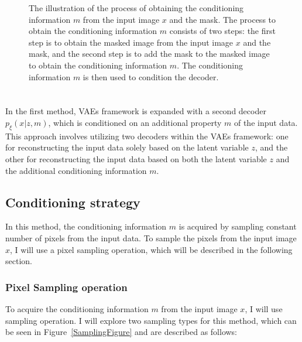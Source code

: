 \begin{figure}
    \centering
    
    \caption[The illustration of the process of obtaining the conditioning information $m$ from the input image $x$ and the mask.]%
    {
        The illustration of the process of obtaining the conditioning information $m$ from the input image $x$ and the mask. The process to obtain the conditioning information $m$ consists of two steps: the first step is to obtain the masked image from the input image $x$ and the mask, and the second step is to add the mask to the masked image to obtain the conditioning information $m$. The conditioning information $m$ is then used to condition the decoder.
    }\label{ConditioningFigure}
\end{figure}



\section{}

In the first method, VAEs framework is expanded with a second decoder
$p_\xi(x|z,m)$, which is conditioned on an additional property $m$ of the input
data. This approach involves utilizing two decoders within the VAEs framework:
one for reconstructing the input data solely based on the latent variable $z$,
and the other for reconstructing the input data based on both the latent
variable $z$ and the additional conditioning information $m$.

\subsection{Conditioning strategy}

In this method, the conditioning information $m$ is acquired by sampling
constant number of pixels from the input data. To sample the pixels from the
input image $x$, I will use a pixel sampling operation, which will be
described in the following section.

\subsubsection{Pixel Sampling operation}

To acquire the conditioning information $m$ from the input image $x$, I will
use sampling operation. I will explore two sampling types for this method,
which can be seen in Figure~\ref{SamplingFigure} and are described as follows:

